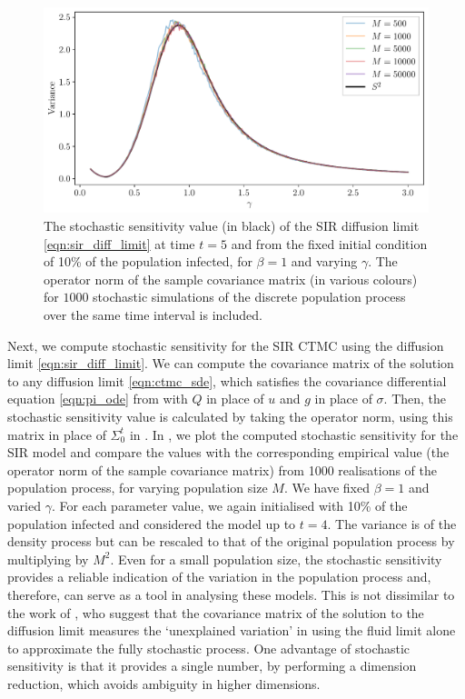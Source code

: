\begin{figure}
	\begin{center}
		\includegraphics[width=\textwidth]{chp07_outlook/figures/sir/sir_s2_R0}
		\caption{The stochastic sensitivity value (in black) of the SIR diffusion limit \cref{eqn:sir_diff_limit} at time \(t = 5\) and from the fixed initial condition of 10\% of the population infected, for \(\beta = 1\) and varying \(\gamma\).
			The operator norm of the sample covariance matrix (in various colours) for \(1000\) stochastic simulations of the discrete population process over the same time interval is included.}
		\label{fig:sir_s2}
	\end{center}
\end{figure}

Next, we compute stochastic sensitivity for the SIR CTMC using the diffusion limit \cref{eqn:sir_diff_limit}.
We can compute the covariance matrix of the solution to any diffusion limit \cref{eqn:ctmc_sde}, which satisfies the covariance differential equation \cref{eqn:pi_ode} from  with \(Q\) in place of \(u\) and \(g\) in place of \(\sigma\).
Then, the stochastic sensitivity value is calculated by taking the operator norm, using this matrix in place of \(\Sigma_0^t\) in .
In , we plot the computed stochastic sensitivity for the SIR model and compare the values with the corresponding empirical value (the operator norm of the sample covariance matrix) from 1000 realisations of the population process, for varying population size \(M\).
We have fixed \(\beta = 1\) and varied \(\gamma\).
For each parameter value, we again initialised with 10\% of the population infected and considered the model up to \(t = 4\).
The variance is of the density process but can be rescaled to that of the original population process by multiplying by \(M^2\).
Even for a small population size, the stochastic sensitivity provides a reliable indication of the variation in the population process and, therefore, can serve as a tool in analysing these models.
This is not dissimilar to the work of \citet{PollettEtAl_2010_ModellingPopulationProcesses}, who suggest that the covariance matrix of the solution to the diffusion limit measures the `unexplained variation' in using the fluid limit alone to approximate the fully stochastic process.
One advantage of stochastic sensitivity is that it provides a single number, by performing a dimension reduction, which avoids ambiguity in higher dimensions. %


